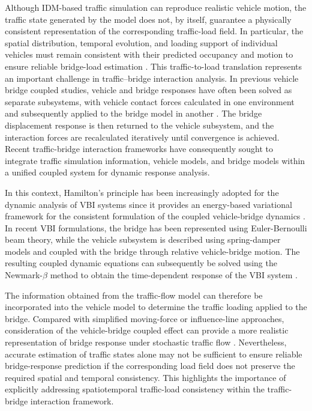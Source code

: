 \documentclass[journal]{IEEEtran}
\begin{document}
Although IDM-based traffic simulation can reproduce realistic vehicle motion, the traffic state generated by the model does not, by itself, guarantee a physically consistent representation of the corresponding traffic-load field. In particular, the spatial distribution, temporal evolution, and loading support of individual vehicles must remain consistent with their predicted occupancy and motion to ensure reliable bridge-load estimation \cite{wangxu2019}. This traffic-to-load translation represents an important challenge in traffic--bridge interaction analysis. In previous vehicle bridge coupled studies, vehicle and bridge responses have often been solved as separate subsystems, with vehicle contact forces calculated in one environment and subsequently applied to the bridge model in another \cite{yangfonder1996,green1994,pan2002}. The bridge displacement response is then returned to the vehicle subsystem, and the interaction forces are recalculated iteratively until convergence is achieved. Recent traffic-bridge interaction frameworks have consequently sought to integrate traffic simulation information, vehicle models, and bridge models within a unified coupled system for dynamic response analysis.

In this context, Hamilton's principle has been increasingly adopted for the dynamic analysis of VBI systems since it provides an energy-based variational framework for the consistent formulation of the coupled vehicle-bridge dynamics \cite{mo2024}. In recent VBI formulations, the bridge has been represented using Euler-Bernoulli beam theory, while the vehicle subsystem is described using spring-damper models and coupled with the bridge through relative vehicle-bridge motion. The resulting coupled dynamic equations can subsequently be solved using the Newmark-$\beta$ method to obtain the time-dependent response of the VBI system \cite{mo2024,newmark1959}. 

The information obtained from the traffic-flow model can therefore be incorporated into the vehicle model to determine the traffic loading applied to the bridge. Compared with simplified moving-force or influence-line approaches, consideration of the vehicle-bridge coupled effect can provide a more realistic representation of bridge response under stochastic traffic flow \cite{yang2005,cantero2010}. Nevertheless, accurate estimation of traffic states alone may not be sufficient to ensure reliable bridge-response prediction if the corresponding load field does not preserve the required spatial and temporal consistency. This highlights the importance of explicitly addressing spatiotemporal traffic-load consistency within the traffic-bridge interaction framework.
\end{document}

